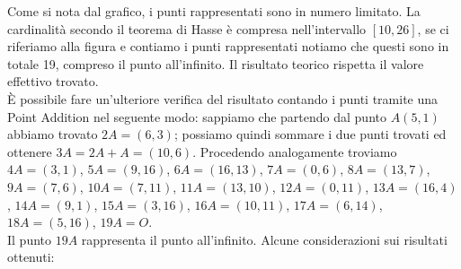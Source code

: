 \documentclass[a4paper,12pt]{tesiinfo}
\begin{document}
Come si nota dal grafico, i punti rappresentati sono in numero limitato. La cardinalit\`a secondo il teorema di Hasse \`e compresa nell'intervallo $[10, 26]$, se ci riferiamo alla figura e contiamo i punti rappresentati notiamo che questi sono in totale 19, compreso il punto all'infinito. Il risultato teorico rispetta il valore effettivo trovato.
\\
\`E possibile fare un'ulteriore verifica del risultato contando i punti tramite una Point Addition nel seguente modo: sappiamo che partendo dal punto $A(5, 1)$ abbiamo trovato $2A = (6, 3)$; possiamo quindi sommare i due punti trovati ed ottenere $3A = 2A + A = (10, 6)$. Procedendo analogamente troviamo $4A = (3, 1)$, $5A = (9, 16)$, $6A = (16, 13)$, $7A = (0, 6)$, $8A = (13, 7)$, $9A = (7, 6)$, $10A = (7, 11)$, $11A = (13, 10)$, $12A = (0, 11)$, $13A = (16, 4)$, $14A = (9, 1)$, $15A = (3, 16)$, $16A = (10, 11)$, $17A = (6, 14)$, $18A = (5, 16)$, $19A = O$.
\\
Il punto $19A$ rappresenta il punto all'infinito.
Alcune considerazioni sui risultati ottenuti:
\end{document}
